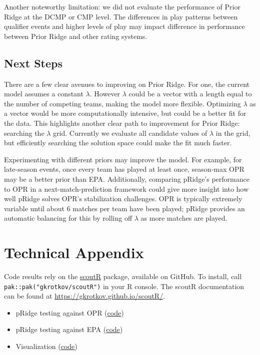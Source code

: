\documentclass[
  12pt]{article}
\providecommand{\tightlist}{%
  \setlength{\itemsep}{0pt}\setlength{\parskip}{0pt}}
\begin{document}
Another noteworthy limitation: we did not evaluate the performance of
Prior Ridge at the DCMP or CMP level. The differences in play patterns
between qualifier events and higher levels of play may impact difference
in performance between Prior Ridge and other rating systems.

\subsection{Next Steps}\label{next-steps}

There are a few clear avenues to improving on Prior Ridge. For one, the
current model assumes a constant \(\lambda\). However \(\lambda\) could
be a vector with a length equal to the number of competing teams, making
the model more flexible. Optimizing \(\lambda\) as a vector would be
more computationally intensive, but could be a better fit for the data.
This highlights another clear path to improvement for Prior Ridge:
searching the \(\lambda\) grid. Currently we evaluate all candidate
values of \(\lambda\) in the grid, but efficiently searching the
solution space could make the fit much faster.

Experimenting with different priors may improve the model. For example,
for late-season events, once every team has played at least once,
season-max OPR may be a better prior than EPA. Additionally, comparing
pRidge's performance to OPR in a next-match-prediction framework could
give more insight into how well pRidge solves OPR's stabilization
challenges. OPR is typically extremely variable until about 6 matches
per team have been played; pRidge provides an automatic balancing for
this by rolling off \(\lambda\) as more matches are played.

\section{Technical Appendix}\label{technical-appendix}

Code results rely on the
\href{https://github.com/GKrotkov/scoutR}{scoutR} package, available on
GitHub. To install, call \texttt{pak::pak("gkrotkov/scoutR")} in your R
console. The scoutR documentation can be found at
\url{https://gkrotkov.github.io/scoutR/}.

\begin{itemize}
\tightlist
\item
  pRidge testing against OPR
  (\href{https://github.com/GKrotkov/pRidge_eval/blob/main/R/2_pridge_opr_comparison.R}{code})
\item
  pRidge testing against EPA
  (\href{https://github.com/GKrotkov/pRidge_eval/blob/main/R/2_pridge_epa_comparison.R}{code})
\item
  Visualization
  (\href{https://github.com/GKrotkov/pRidge_eval/blob/main/R/3_pridge_viz.R}{code})
\end{itemize}
\end{document}
